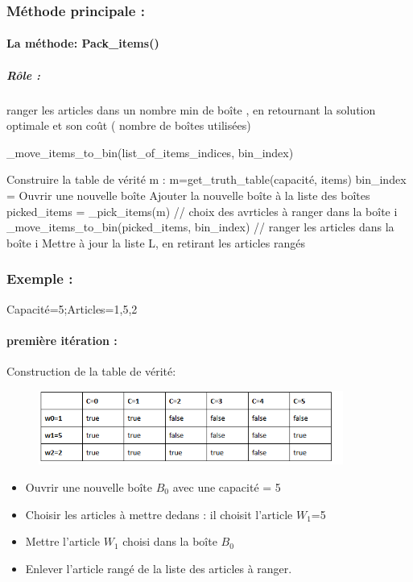 \documentclass[12pt]{article}
\begin{document}
\subsubsection{Méthode principale :}
\paragraph{La méthode: Pack\_items()}
  \subparagraph{Rôle :}
  ranger les articles dans un nombre min de boîte , en retournant la solution optimale et son coût ( nombre de boîtes utilisées)
 \begin{algorithm}[H]
     \caption{ \_move\_items\_to\_bin(list\_of\_items\_indices, bin\_index)}
     \begin{algorithmic} 
            \STATE Construire la table de vérité m : m=get\_truth\_table(capacité, items)
            \STATE  bin\_index = Ouvrir une nouvelle boîte
            \STATE  Ajouter la nouvelle boîte à la liste des boîtes
            \STATE   picked\_items = \_pick\_items(m) // choix des avrticles à ranger dans la boîte i 
            \STATE  \_move\_items\_to\_bin(picked\_items, bin\_index) // ranger les articles dans la boîte i
            \STATE   Mettre à jour la liste L, en retirant les articles rangés


        \ENDWHILE
    \end{algorithmic} 
  \end{algorithm}
  \subsubsection*{Exemple :}
  Capacité=5;Articles={1,5,2}
  \paragraph{première itération :}
  Construction de la table de vérité:\linebreak
  \begin{figure}[h!]
    \includegraphics[width=10cm]{../figures/tabit1.png}
\end{figure}
\begin{itemize}
    \item Ouvrir une nouvelle boîte $B_0$ avec une capacité = 5
    \item Choisir les articles à mettre dedans : il choisit l’article $W_1$=5 
    \item Mettre l’article $W_1$ choisi dans la boîte $B_0$
    \item Enlever l’article rangé de la liste des articles à ranger.


\end{itemize}
\end{document}
